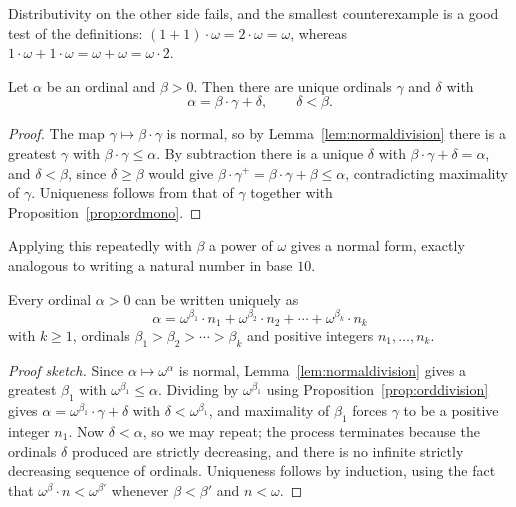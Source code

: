 \documentclass[a4paper]{scrartcl}
\begin{document}
Distributivity on the other side fails, and the smallest counterexample is a good test of the definitions: $(1 + 1)\cdot \omega = 2 \cdot \omega = \omega$, whereas $1 \cdot \omega + 1 \cdot \omega = \omega + \omega = \omega \cdot 2$.

\begin{proposition}\label{prop:orddivision}
  Let $\alpha$ be an ordinal and $\beta > 0$. Then there are unique ordinals $\gamma$ and $\delta$ with
  $$\alpha = \beta \cdot \gamma + \delta, \qquad \delta < \beta.$$
\end{proposition}
\begin{proof}
  The map $\gamma \mapsto \beta\cdot\gamma$ is normal, so by Lemma~\ref{lem:normaldivision} there is a greatest $\gamma$ with $\beta\cdot\gamma \leq \alpha$. By subtraction there is a unique $\delta$ with $\beta\cdot\gamma + \delta = \alpha$, and $\delta < \beta$, since $\delta \geq \beta$ would give $\beta\cdot\gamma^+ = \beta\cdot\gamma + \beta \leq \alpha$, contradicting maximality of $\gamma$. Uniqueness follows from that of $\gamma$ together with Proposition~\ref{prop:ordmono}.
\end{proof}

Applying this repeatedly with $\beta$ a power of $\omega$ gives a normal form, exactly analogous to writing a natural number in base $10$.

\begin{theorem}
  Every ordinal $\alpha > 0$ can be written uniquely as
  $$\alpha = \omega^{\beta_1}\cdot n_1 + \omega^{\beta_2}\cdot n_2 + \cdots + \omega^{\beta_k}\cdot n_k$$
  with $k \geq 1$, ordinals $\beta_1 > \beta_2 > \cdots > \beta_k$ and positive integers $n_1, \dots, n_k$.
\end{theorem}
\begin{proof}[Proof sketch]
  Since $\alpha \mapsto \omega^\alpha$ is normal, Lemma~\ref{lem:normaldivision} gives a greatest $\beta_1$ with $\omega^{\beta_1} \leq \alpha$. Dividing by $\omega^{\beta_1}$ using Proposition~\ref{prop:orddivision} gives $\alpha = \omega^{\beta_1}\cdot \gamma + \delta$ with $\delta < \omega^{\beta_1}$, and maximality of $\beta_1$ forces $\gamma$ to be a positive integer $n_1$. Now $\delta < \alpha$, so we may repeat; the process terminates because the ordinals $\delta$ produced are strictly decreasing, and there is no infinite strictly decreasing sequence of ordinals. Uniqueness follows by induction, using the fact that $\omega^{\beta}\cdot n < \omega^{\beta'}$ whenever $\beta < \beta'$ and $n < \omega$.
\end{proof}
\end{document}
